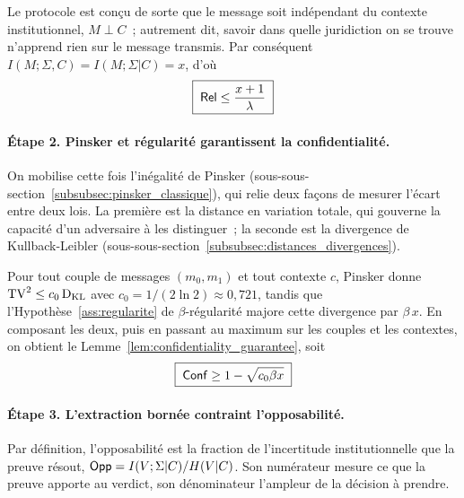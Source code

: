 \begin{sloppypar}
\begin{Preuve}
    Le protocole est con\c{c}u de sorte que le message soit ind\'ependant du
    contexte institutionnel, $M \perp C$~; autrement dit, savoir dans quelle juridiction on
    se trouve n'apprend rien sur le message transmis. Par cons\'equent
    $I(M;\Sigma,C) = I(M;\Sigma|C) = x$, d'o\`u
    \begin{equation}
    \boxed{\;\mathsf{Rel} \leq \frac{x + 1}{\lambda}\;}
    \label{eq:etape1_rel}
    \end{equation}

    \paragraph{\'Etape 2. Pinsker et r\'egularit\'e garantissent la confidentialit\'e.}
    On mobilise cette fois l'in\'egalit\'e de Pinsker
    (sous-sous-section~\ref{subsubsec:pinsker_classique}), qui relie deux
    fa\c{c}ons de mesurer l'\'ecart entre deux lois. La premi\`ere est la distance
    en variation totale, qui gouverne la capacit\'e d'un adversaire \`a les
    distinguer~; la seconde est la divergence de Kullback-Leibler
    (sous-sous-section~\ref{subsubsec:distances_divergences}).

    Pour tout couple de messages $(m_0, m_1)$ et tout contexte $c$, Pinsker
    donne $\operatorname{TV}^2 \leq c_0 \operatorname{D_{\text{KL}}}$ avec $c_0 = 1/(2\ln 2) \approx 0{,}721$, tandis que
    l'Hypoth\`ese~\ref{ass:regularite} de $\beta$-r\'egularit\'e majore cette
    divergence par $\beta\,x$. En composant les deux, puis en passant au
    maximum sur les couples et les contextes, on obtient le
    Lemme~\ref{lem:confidentiality_guarantee}, soit
    \begin{equation}
    \boxed{\;\mathsf{Conf} \geq 1 - \sqrt{c_0 \beta x}\;}
    \label{eq:etape2_conf}
    \end{equation}

    \paragraph{\'Etape 3. L'extraction born\'ee contraint l'opposabilit\'e.}
    Par d\'efinition, l'opposabilit\'e est la fraction de l'incertitude
    institutionnelle que la preuve r\'esout,
    $\mathsf{Opp} = I(V;\Sigma|C)/H(V|C)$. Son num\'erateur mesure ce que la preuve
    apporte au verdict, son d\'enominateur l'ampleur de la d\'ecision \`a
    prendre.


\end{Preuve}
\end{sloppypar}
